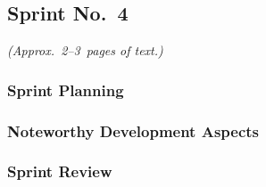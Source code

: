 
\subsection{Sprint No.~4}

\emph{(Approx.~2--3~pages of text.)}

\subsubsection*{Sprint Planning}

\subsubsection*{Noteworthy Development Aspects}

\subsubsection*{Sprint Review}



